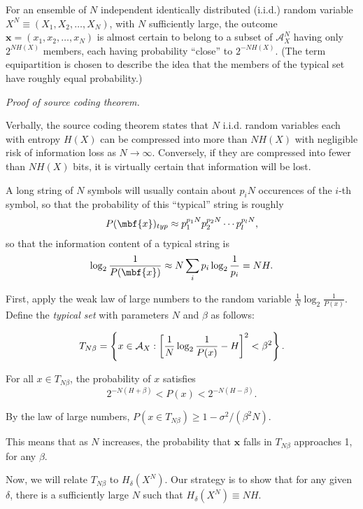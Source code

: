 \begin{theorem} For an ensemble of $N$ independent identically distributed (i.i.d.) random variable $X^{N} \equiv (X_1, X_2, \dots, X_N)$, with $N$ sufficiently large, the outcome $\mathbf{x} = (x_1, x_2, \dots, x_N)$ is almost certain to belong to a subset of $\mathcal{A}_X^{N}$ having only $2^{NH(X)}$ members, each having probability ``close'' to $2^{-NH(X)}$.  (The term equipartition is chosen to describe the idea that the members of the typical set have roughly equal probability.)
\end{theorem}

{\it Proof of source coding theorem.}

Verbally, the source coding theorem states that $N$ i.i.d. random variables each with entropy $H(X)$ can be compressed into more than $N H(X)$ with negligible risk of information loss as $N \to \infty$.  Conversely, if they are compressed into fewer than $NH(X)$ bits, it is virtually certain that information will be lost.

A long string of $N$ symbols will usually contain about $p_i N$ occurences of the $i$-th symbol, so that the probability of this ``typical'' string is roughly
\begin{align*}
  P(\mbf{x})_{typ} \approx p_1^{p_1N} p_2^{p_2 N} \cdots p_l^{p_l N},
\end{align*}
so that the information content of a typical string is 
\[
  \log_2 \frac{1}{P(\mbf{x})} \approx N \sum_{i} p_i \log_2 \frac{1}{p_i} = NH.
\]

First, apply the weak law of large numbers to the random variable $\frac{1}{N} \log_2 \frac{1}{P(x)}$.  Define the {\it typical set} with parameters $N$ and $\beta$ as follows:

\begin{align*}
  T_{N \beta} = \left\{ x \in \AA_{X}: \left[ \frac{1}{N} \log_2 \frac{1}{P(x)} - H \right]^2 < \beta^2 \right\}.
\end{align*}

For all $x \in T_{N \beta}$, the probability of $x$ satisfies 
\[
  2^{-N (H + \beta)} < P(x) < 2^{-N (H- \beta)}.
\]

  By the law of large numbers, $P(x \in T_{N \beta}) \geq 1 - \sigma^2 / (\beta^2 N)$.

  This means that as $N$ increases, the probability that $\mathbf{x}$ falls in $T_{N \beta}$ approaches 1, for any $\beta$.

  Now, we will relate $T_{N \beta}$ to $H_{\delta}(X^N)$.   Our strategy is to show that for any given $\delta$, there is a sufficiently large $N$ such that $H_{\delta}(X^N) \equiv NH$.


